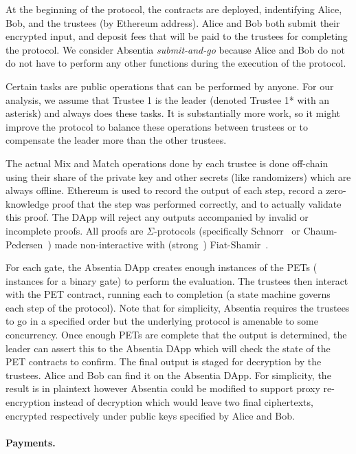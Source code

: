 At the beginning of the protocol, the contracts are deployed, indentifying Alice, Bob, and the trustees (by Ethereum address). Alice and Bob both submit their encrypted input, and deposit fees that will be paid to the trustees for completing the protocol. We consider Absentia \emph{submit-and-go} because Alice and Bob do not do not have to perform any other functions during the execution of the protocol. 
 
Certain tasks are public operations that can be performed by anyone. For our analysis, we assume that Trustee 1 is the leader (denoted Trustee 1* with an asterisk) and always does these tasks. It is substantially more work, so it might improve the protocol to balance these operations between trustees or to compensate the leader more than the other trustees.

The actual Mix and Match operations done by each trustee is done off-chain using their share of the private key and other secrets (like randomizers) which are always offline. Ethereum is used to record the output of each step, record a zero-knowledge proof that the step was performed correctly, and to actually validate this proof. The DApp will reject any outputs accompanied by invalid or incomplete proofs. All proofs are $\Sigma$-protocols (specifically Schnorr~\cite{Sch91} or Chaum-Pedersen~\cite{CP92}) made non-interactive with (strong~\cite{BPW12}) Fiat-Shamir~\cite{FS86}. 
 
For each gate, the Absentia DApp creates enough instances of the PETs ( instances for a binary gate) to perform the evaluation. The trustees then interact with the PET contract, running each to completion (a state machine governs each step of the protocol). Note that for simplicity, Absentia requires the trustees to go in a specified order but the underlying protocol is amenable to some concurrency. Once enough PETs are complete that the output is determined, the leader can assert this to the Absentia DApp which will check the state of the PET contracts to confirm. The final output is staged for decryption by the trustees. Alice and Bob can find it on the Absentia DApp. For simplicity, the result is in plaintext however Absentia could be modified to support proxy re-encryption instead of decryption which would leave two final ciphertexts,  encrypted respectively under public keys specified by Alice and Bob. 


\paragraph{Payments.}

